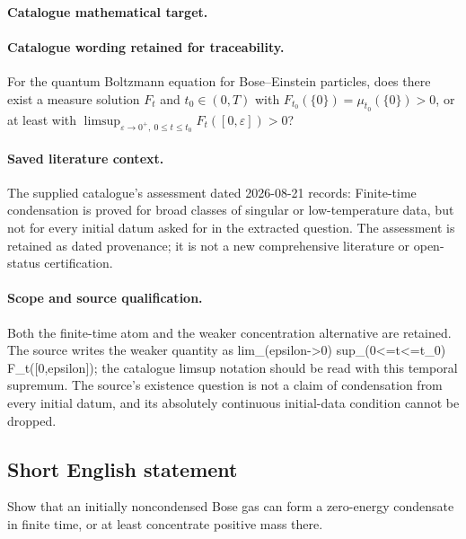 \documentclass[11pt]{article}
\begin{document}
\paragraph{Catalogue mathematical target.}
\paragraph{Catalogue wording retained for traceability.}
For the quantum Boltzmann equation for Bose–Einstein particles, does there exist a measure solution $F_t$ and $t_0\in(0,T)$ with $F_{t_0}(\{0\})=\mu_{t_0}(\{0\})>0$, or at least with $\limsup_{\varepsilon\to0^+,\ 0\leq t\leq t_0}F_t([0,\varepsilon])>0$?

\paragraph{Saved literature context.} The supplied catalogue's assessment dated 2026-08-21 records: Finite-time condensation is proved for broad classes of singular or low-temperature data, but not for every initial datum asked for in the extracted question. The assessment is retained as dated provenance; it is not a new comprehensive literature or open-status certification.
\paragraph{Scope and source qualification.}Both the finite-time atom and the weaker concentration alternative are retained. The source writes the weaker quantity as lim_(epsilon->0) sup_(0<=t<=t_0) F_t([0,epsilon]); the catalogue limsup notation should be read with this temporal supremum. The source's existence question is not a claim of condensation from every initial datum, and its absolutely continuous initial-data condition cannot be dropped.
\subsection{Short English statement}
Show that an initially noncondensed Bose gas can form a zero-energy condensate in finite time, or at least concentrate positive mass there.
\end{document}

